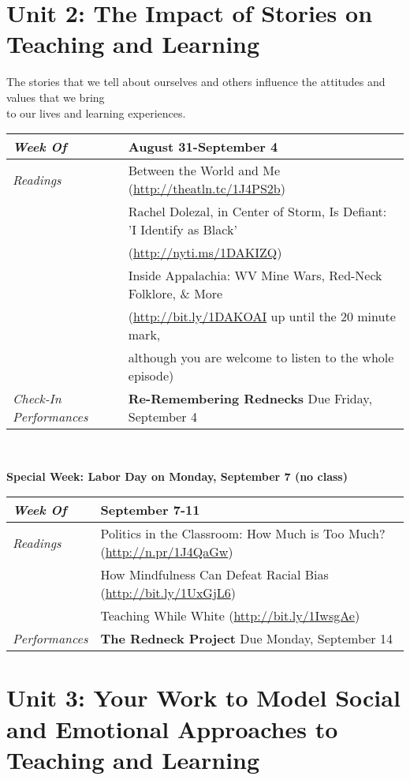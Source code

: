 \documentclass{article}
\newcommand{\gentopic}[1]{\begin{center}\faKey \textsf{#1}\end{center}}
\newcommand{\tabread}{\faBook\medspace\textit{Readings}}
\newcommand{\tabperformance}{\faTasks\medspace\textit{Performances}}
\newcommand{\tabdt}{\faCalendar\medspace\textit{Week Of}}
\newcommand{\tabcheckin}{\faCheckSquareO\medspace\textit{Check-In Performances}}
\newcommand{\tabbreak}{\begin{center}\faAsterisk\faAsterisk\faAsterisk\\\end{center}}
\newcommand{\specialweek}[1]{\begin{center}\textbf{\faBullhorn\medspace Special Week: #1 \medspace\faBullhorn}\end{center}}
\newenvironment{tabsched}
	{\small
	\begin{tabular}{p{1.5in}p{4.5in}}
	\midrule}
	{\midrule
	\end{tabular}
	\normalsize}
\newcommand{\weekthree}{August 31-September 4}
\newcommand{\weekfour}{September 7-11}
\newcommand{\laborday}{Labor Day on Monday, September 7 (no class)}
\begin{document}
	\section{Unit 2: The Impact of Stories on Teaching and Learning}

\gentopic{The stories that we tell about ourselves and others influence the attitudes and values that we bring\\to our lives and learning experiences.}

\begin{tabsched}
	\tabdt & \weekthree \\
	\midrule
	\tabread & Between the World and Me (\url{http://theatln.tc/1J4PS2b}) \\
	& Rachel Dolezal, in Center of Storm, Is Defiant: 'I Identify as Black' \\
	& (\url{http://nyti.ms/1DAKIZQ}) \\
	& Inside Appalachia: WV Mine Wars, Red-Neck Folklore, \& More \\
	& (\url{http://bit.ly/1DAKOAI} up until the 20 minute mark, \\
	& although you are welcome to listen to the whole episode) \\
	\midrule
	\tabcheckin & \textbf{Re-Remembering Rednecks} Due Friday, September 4 \\ %
\end{tabsched}

\tabbreak

\specialweek{\laborday}

\begin{tabsched}
	\tabdt & \weekfour \\
	\midrule
	\tabread & Politics in the Classroom: How Much is Too Much? (\url{http://n.pr/1J4QaGw}) \\
	& How Mindfulness Can Defeat Racial Bias (\url{http://bit.ly/1UxGjL6}) \\
	& Teaching While White (\url{http://bit.ly/1IwsgAe})\\
	\midrule
	\tabperformance & \textbf{The Redneck Project} Due Monday, September 14 \\
\end{tabsched}

	\section{Unit 3: Your Work to Model Social and Emotional Approaches to Teaching and Learning}
\end{document}
